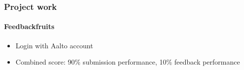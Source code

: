 \documentclass[english,t]{beamer}
\begin{document}
\begin{frame}
  \frametitle{Project work}  %
  \framesubtitle{Feedbackfruits}

  \begin{itemize}
  \item Login with Aalto account
  \item Combined score: 90\% submission performance, 10\% feedback performance
  \end{itemize}
  
\end{frame}

  
\end{document}
